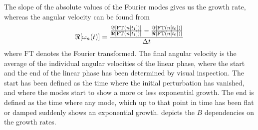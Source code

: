 %
The slope of the absolute values of the Fourier modes gives us the growth rate, whereas the angular velocity can be found from
%
\begin{align*}
    \Re[\omega_n(t)] =
    \frac{
        \frac{\Im[\text{FT}(n[t_1])]}{\Re[\text{FT}(n[t_1])]} -
        \frac{\Im[\text{FT}(n[t_0])]}{\Re[\text{FT}(n[t_0])]}
    }{\Delta t}
\end{align*}
%
where $\text{FT}$ denotes the Fourier transformed.
The final angular velocity is the average of the individual angular velocities of the linear phase, where the start and the end of the linear phase has been determined by visual inspection.
The start has been defined as the time where the initial perturbation has vanished, and where the modes start to show a more or less exponential growth.
The end is defined as the time where any mode, which up to that point in time has been flat or damped suddenly shows an exponential growth.
 depicts the $B$ dependencies on the growth rates.
%
